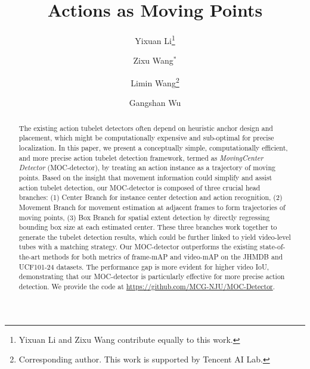\documentclass[runningheads]{llncs}
\begin{document}
\renewcommand{\thefootnote}{\fnsymbol{footnote}}
\pagestyle{headings}
\mainmatter

\title{Actions as Moving Points}





\author{Yixuan Li\thanks{Yixuan Li and Zixu Wang contribute equally to this work.} \and
Zixu Wang$^*$ \and
Limin Wang\thanks{Corresponding author. This work is supported by Tencent AI Lab.} \and
Gangshan Wu
}

\maketitle
\begin{abstract}
  The existing action tubelet detectors often depend on heuristic anchor design and placement, which might be computationally expensive and sub-optimal for precise localization. In this paper, we present a conceptually simple, computationally efficient, and more precise action tubelet detection framework, termed as {\em MovingCenter Detector} (MOC-detector), by treating an action instance as a trajectory of moving points. Based on the insight that movement information could simplify and assist action tubelet detection, our MOC-detector is composed of three crucial head branches: (1) Center Branch for instance center detection and action recognition, (2) Movement Branch for movement estimation at adjacent frames to form trajectories of moving points, (3) Box Branch for spatial extent detection by directly regressing bounding box size at each estimated center. These three branches work together to generate the tubelet detection results, which could be further linked to yield video-level tubes with a matching strategy. Our MOC-detector outperforms the existing state-of-the-art methods for both metrics of frame-mAP and video-mAP on the JHMDB and UCF101-24 datasets. The performance gap is more evident for higher video IoU, demonstrating that our MOC-detector is particularly effective for more precise action detection. We provide the code at \href{https://github.com/MCG-NJU/MOC-Detector}{https://github.com/MCG-NJU/MOC-Detector}.
\end{abstract}
\end{document}
